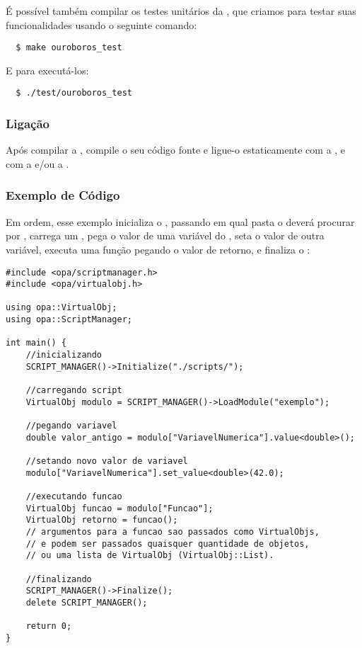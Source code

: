 É possível também compilar os testes unitários da , que
criamos para testar suas funcionalidades usando o seguinte comando:
\begin{verbatim}
  $ make ouroboros_test
\end{verbatim}
E para executá-los:
\begin{verbatim}
  $ ./test/ouroboros_test
\end{verbatim}
    
\subsubsection{Ligação} 
Após compilar a , compile o seu código fonte e ligue-o estaticamente
com a , e com a  e/ou a .
    
\subsubsection{Exemplo de Código} 
Em ordem, esse exemplo inicializa o \SMgr{}, passando em qual pasta
o \SMgr{} deverá procurar por , carrega um \script{},
pega o valor de uma variável do \script{}, seta o valor de outra variável, 
executa uma função pegando o valor de retorno, e finaliza o \SMgr{}:
    
\begin{lstlisting}
#include <opa/scriptmanager.h>
#include <opa/virtualobj.h>

using opa::VirtualObj;
using opa::ScriptManager;

int main() {
    //inicializando
    SCRIPT_MANAGER()->Initialize("./scripts/");
    
    //carregando script
    VirtualObj modulo = SCRIPT_MANAGER()->LoadModule("exemplo");
    
    //pegando variavel
    double valor_antigo = modulo["VariavelNumerica"].value<double>();
    
    //setando novo valor de variavel
    modulo["VariavelNumerica"].set_value<double>(42.0);
    
    //executando funcao
    VirtualObj funcao = modulo["Funcao"];
    VirtualObj retorno = funcao(); 
    // argumentos para a funcao sao passados como VirtualObjs, 
    // e podem ser passados quaisquer quantidade de objetos,
    // ou uma lista de VirtualObj (VirtualObj::List).
    
    //finalizando
    SCRIPT_MANAGER()->Finalize();
    delete SCRIPT_MANAGER();
    
    return 0;
}
\end{lstlisting}

